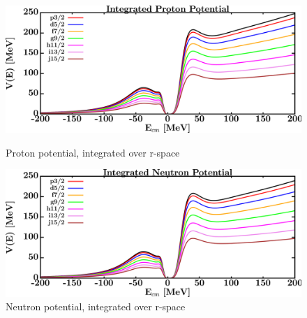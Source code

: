 \begin{figure}[H]
    \centering
    \begin{minipage}{0.45\textwidth}
        \centering
        \includegraphics[width=1.0\textwidth]{figures/o18_protonVolumeIntegrals.png}
        \caption{Proton potential, integrated over r-space}
        \label{DOMFitData_o18_proton_potentialIntegral}
    \end{minipage}\hfill
    \begin{minipage}{0.45\textwidth}
        \centering
        \includegraphics[width=1.0\textwidth]{figures/o18_neutronVolumeIntegrals.png}
        \caption{Neutron potential, integrated over r-space}
        \label{DOMFitData_o18_neutron_potentialIntegral}
    \end{minipage}
\end{figure}

\afterpage{\clearpage}

